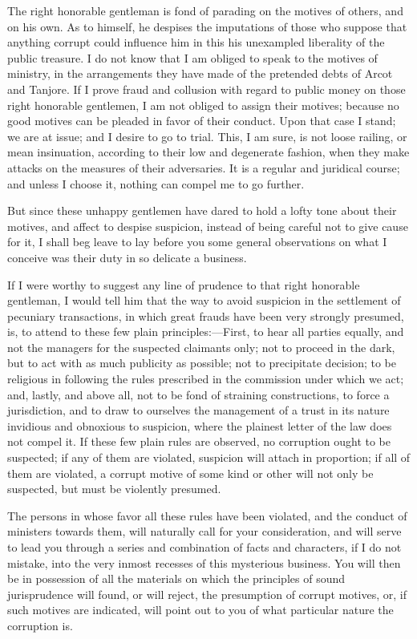 The right honorable gentleman is fond of parading on the motives of others, and on his own. As to himself, he despises the imputations of those who suppose that anything corrupt could influence him in this his unexampled liberality of the public treasure. I do not know that I am obliged to speak to the motives of ministry, in the arrangements they have made of the pretended debts of Arcot and Tanjore. If I prove fraud and collusion with regard to public money on those right honorable gentlemen, I am not obliged to assign their motives; because no good motives can be pleaded in favor of their conduct. Upon that case I stand; we are at issue; and I desire to go to trial. This, I am sure, is not loose railing, or mean insinuation, according to their low and degenerate fashion, when they make attacks on the measures of their adversaries. It is a regular and juridical course; and unless I choose it, nothing can compel me to go further.

But since these unhappy gentlemen have dared to hold a lofty tone about their motives, and affect to despise suspicion, instead of being careful not to give cause for it, I shall beg leave to lay before you some general observations on what I conceive was their duty in so delicate a business.

If I were worthy to suggest any line of prudence to that right honorable gentleman, I would tell him that the way to avoid suspicion in the settlement of pecuniary transactions, in which great frauds have been very strongly presumed, is, to attend to these few plain principles:—First, to hear all parties equally, and not the managers for the suspected claimants only; not to proceed in the dark, but to act with as much publicity as possible; not to precipitate decision; to be religious in following the rules prescribed in the commission under which we act; and, lastly, and above all, not to be fond of straining constructions, to force a jurisdiction, and to draw to ourselves the management of a trust in its nature invidious and obnoxious to suspicion, where the plainest letter of the law does not compel it. If these few plain rules are observed, no corruption ought to be suspected; if any of them are violated, suspicion will attach in proportion; if all of them are violated, a corrupt motive of some kind or other will not only be suspected, but must be violently presumed.

The persons in whose favor all these rules have been violated, and the conduct of ministers towards them, will naturally call for your consideration, and will serve to lead you through a series and combination of facts and characters, if I do not mistake, into the very inmost recesses of this mysterious business. You will then be in possession of all the materials on which the principles of sound jurisprudence will found, or will reject, the presumption of corrupt motives, or, if such motives are indicated, will point out to you of what particular nature the corruption is.


